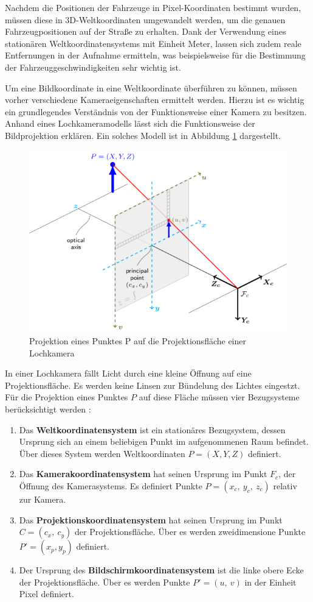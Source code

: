Nachdem die Positionen der Fahrzeuge in Pixel-Koordinaten bestimmt wurden, müssen diese in 3D-Weltkoordinaten
umgewandelt werden, um die genauen Fahrzeugpositionen auf der Straße zu erhalten. Dank der Verwendung eines
stationären Weltkoordinatensystems mit Einheit Meter, lassen sich zudem reale Entfernungen
in der Aufnahme ermitteln, was beispielsweise für die Bestimmung der Fahrzeuggeschwindigkeiten sehr wichtig ist.

Um eine Bildkoordinate in eine Weltkoordinate überführen zu können, müssen vorher verschiedene Kameraeigenschaften
ermittelt werden. Hierzu ist es wichtig ein grundlegendes Verständnis von der Funktionsweise einer Kamera zu besitzen.
Anhand eines Lochkameramodells lässt sich die Funktionsweise der Bildprojektion erklären.
Ein solches Modell ist in Abbildung \ref{fig:grund_pinhole_model} dargestellt.

\begin{figure}[H]
    \centering
    \includegraphics[width=0.55\linewidth]{resources/img/grundlagen/TrajectoryReconstruction/pinhole_camera_model}
    \caption[Bildprojektion im Lochkameramodell]{Projektion eines Punktes P auf die Projektionsfläche einer Lochkamera \cite[]{DevTeamOpenCV2018}}
    \label{fig:grund_pinhole_model}
\end{figure}

In einer Lochkamera fällt Licht durch eine kleine Öffnung auf eine Projektionsfläche. Es werden keine Linsen
zur Bündelung des Lichtes eingestzt. Für die Projektion eines Punktes $P$ auf diese Fläche müssen vier
Bezugsysteme berücksichtigt werden \cite[]{Jahne2012}:

\begin{enumerate}
    \item Das \textbf{Weltkoordinatensystem} ist ein stationäres Bezugsystem, dessen Ursprung sich an einem beliebigen Punkt
            im aufgenommenen Raum befindet. Über dieses System werden Weltkoordinaten $P = (X, Y, Z)$ definiert.
    \item Das \textbf{Kamerakoordinatensystem} hat seinen Ursprung im Punkt $F_c$, der Öffnung des Kamerasystems.
            Es definiert Punkte $P = (x_c,\ y_c,\ z_c)$ relativ zur Kamera.
    \item Das \textbf{Projektionskoordinatensystem} hat seinen Ursprung im Punkt $C = (c_x,\ c_y)$ der Projektionsfläche.
            Über es werden zweidimensione Punkte $P' = (x_p, y_p)$ definiert.
    \item Der Ursprung des \textbf{Bildschirmkoordinatensystem} ist die linke obere Ecke der Projektionsfläche.
            Über es werden Punkte $P' = (u,\ v)$ in der Einheit Pixel definiert.
\end{enumerate}


